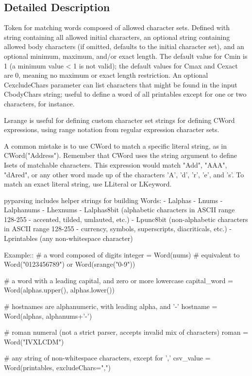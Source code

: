 \subsection{Detailed Description}
\begin{DoxyVerb}Token for matching words composed of allowed character sets.
Defined with string containing all allowed initial characters,
an optional string containing allowed body characters (if omitted,
defaults to the initial character set), and an optional minimum,
maximum, and/or exact length.  The default value for C{min} is 1 (a
minimum value < 1 is not valid); the default values for C{max} and C{exact}
are 0, meaning no maximum or exact length restriction. An optional
C{excludeChars} parameter can list characters that might be found in 
the input C{bodyChars} string; useful to define a word of all printables
except for one or two characters, for instance.

L{srange} is useful for defining custom character set strings for defining 
C{Word} expressions, using range notation from regular expression character sets.

A common mistake is to use C{Word} to match a specific literal string, as in 
C{Word("Address")}. Remember that C{Word} uses the string argument to define
I{sets} of matchable characters. This expression would match "Add", "AAA",
"dAred", or any other word made up of the characters 'A', 'd', 'r', 'e', and 's'.
To match an exact literal string, use L{Literal} or L{Keyword}.

pyparsing includes helper strings for building Words:
 - L{alphas}
 - L{nums}
 - L{alphanums}
 - L{hexnums}
 - L{alphas8bit} (alphabetic characters in ASCII range 128-255 - accented, tilded, umlauted, etc.)
 - L{punc8bit} (non-alphabetic characters in ASCII range 128-255 - currency, symbols, superscripts, diacriticals, etc.)
 - L{printables} (any non-whitespace character)

Example::
    # a word composed of digits
    integer = Word(nums) # equivalent to Word("0123456789") or Word(srange("0-9"))
    
    # a word with a leading capital, and zero or more lowercase
    capital_word = Word(alphas.upper(), alphas.lower())

    # hostnames are alphanumeric, with leading alpha, and '-'
    hostname = Word(alphas, alphanums+'-')
    
    # roman numeral (not a strict parser, accepts invalid mix of characters)
    roman = Word("IVXLCDM")
    
    # any string of non-whitespace characters, except for ','
    csv_value = Word(printables, excludeChars=",")
\end{DoxyVerb}
 

